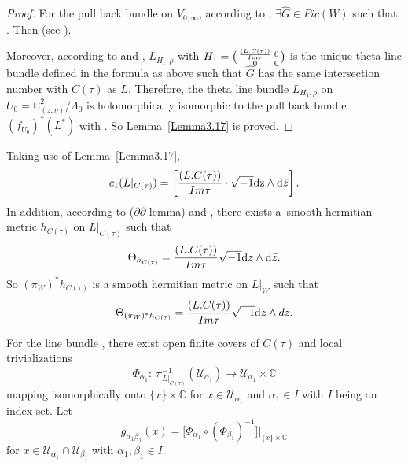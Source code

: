 \documentclass[10pt,a4paper]{amsart}
\numberwithin{equation}{section}
\def\operatorname#1{#1}
\def\overline#1{#1}
\begin{document}
\begin{proof}
For the pull back bundle  on $V_{0,\infty}$, according to \cite[Proposition~3.5]{Takayuki-Takato2}, $\exists \hat{G} \in \operatorname{Pic}(W) $ such that . Then  (see \cite[Lemma~3.4]{Takayuki-Takato2}).

Moreover, according to \cite[Lemma~3.4]{Takayuki-Takato2} and \cite[Proposition~3.5]{Takayuki-Takato2}, $L_{H_1,\rho}$ with $H_1=\smash{\bigl(\begin{smallmatrix}
\frac{(L.C(\tau))}{\operatorname{ Im}\tau} & 0\\
0&0
\end{smallmatrix}\bigr)}$ is the unique theta line bundle defined in the formula as above such that $\hat{G}$ has the same intersection number with $C(\tau)$ as $L$. Therefore, the theta line bundle $L_{H_1, \rho}$ on $U_0=\mathbb{C}^2_{(z,\eta)}/{\Lambda_0}$ is holomorphically isomorphic to the pull back bundle $(f_{U_0})^*(L^*)$ with \smash{$H_1\!=\!\bigl(\!\begin{smallmatrix}
\frac{(L.C(\tau))}{\operatorname{ Im}\tau} & 0\\
0&0
\end{smallmatrix}\bigr)$}. So Lemma~\ref{Lemma3.17} is proved.
\end{proof}


Taking use of Lemma~\ref{Lemma3.17},
\[
c_1(L|_{C(\tau)})=\left[\frac{(L.C(\tau))}{\operatorname{Im}\tau}\cdot \sqrt{-1}\text{{\rm d}z}\land {\rm d}\bar{z}\right].
\]
In addition, according to \cite[Lemma~7.31]{Vincent-Ahmed} ($\partial \overline{\partial}$-lemma) and \cite[Section 8.2]{Vincent-Ahmed}, there exists a~smooth hermitian metric $h_{C(\tau)}$ on $L|_{C(\tau)}$ such that
\[
\Theta_{h_{C(\tau)}} = \frac{(L.C(\tau))}{\operatorname{ Im}\tau} \sqrt{-1} {\rm d}z \wedge {\rm d} \bar{z}.
\]
 So $(\pi_W)^*h_{C(\tau)}$ is a smooth hermitian metric on $L|_W$ such that
\[
\Theta_{(\pi_W)^*h_{C(\tau)}}=\frac{(L.C(\tau))}{\operatorname{Im}\tau} \sqrt{-1} {\rm d}z \wedge d \bar{z}.
\]

For the line bundle , there exist open finite covers  of $C(\tau)$ and local trivializations
\[
\Phi_{\alpha_1}\colon \ \pi^{-1}_{L|_{C(\tau)}}(\mathcal{U}_{\alpha_1}) \rightarrow \mathcal{U}_{\alpha_1} \times \mathbb{C}
\]
 mapping  isomorphically onto $ \{ x \} \times \mathbb{C}$ for $x \in \mathcal{U}_{\alpha_1}$ and $\alpha_1 \in I$ with $I$ being an index set. Let
\[
g_{\alpha_1 \beta_1}(x)=\big[\Phi_{\alpha_1} \circ (\Phi_{\beta_1})^{-1}\big]|_{ \{ x \} \times \mathbb{C}}
\]
for $ x \in \mathcal{U}_{\alpha_1} \cap \mathcal{U}_{\beta_1}$ with $\alpha_1, \beta_1 \in I$.
\end{document}
